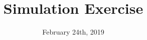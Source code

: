 \documentclass{beamer}
\begin{document}
\newcommand{\clg}{\mathcal{G}}
\newcommand{\clb}{\mathcal{B}}
\newcommand{\cls}{\mathcal{S}}
\newcommand{\clc}{\mathcal{C}}
\newcommand{\clj}{\mathcal{J}}
\newcommand{\clm}{\mathcal{M}}
\newcommand{\clx}{\mathcal{X}}
\newcommand{\cld}{\mathcal{D}}
\newcommand{\cle}{\mathcal{E}}
\newcommand{\clv}{\mathcal{V}}
\newcommand{\clu}{\mathcal{U}}
\newcommand{\clr}{\mathcal{R}}
\newcommand{\clt}{\mathcal{T}}
\newcommand{\cll}{\mathcal{L}}
\newcommand{\clz}{\mathcal{Z}}
\newcommand{\clq}{\mathcal{Q}}

\newcommand{\cli}{\mathcal{I}}
\newcommand{\clp}{\mathcal{P}}
\newcommand{\cla}{\mathcal{A}}
\newcommand{\clf}{\mathcal{F}}
\newcommand{\clh}{\mathcal{H}}
\newcommand{\clo}{\mathcal{O}}
\newcommand{\N}{\mathbb{N}}
\newcommand{\Q}{\mathbb{Q}}
\newcommand{\bfx}{{\boldsymbol{x}}}
\newcommand{\bfa}{{\boldsymbol{a}}}
\newcommand{\bfh}{{\boldsymbol{h}}}
\newcommand{\bfs}{{\boldsymbol{s}}}
\newcommand{\bfm}{{\boldsymbol{m}}}
\newcommand{\bff}{{\boldsymbol{f}}}
\newcommand{\bfb}{{\boldsymbol{b}}}
\newcommand{\bfw}{{\boldsymbol{w}}}
\newcommand{\bfz}{{\boldsymbol{z}}}
\newcommand{\bfu}{{\boldsymbol{u}}}
\newcommand{\bfell}{{\boldsymbol{\ell}}}
\newcommand{\bfn}{{\boldsymbol{n}}}
\newcommand{\bfd}{{\boldsymbol{d}}}
\newcommand{\bfbeta}{{\boldsymbol{\beta}}}
\newcommand{\bfzeta}{{\boldsymbol{\zeta}}}
\newcommand{\bfnu}{{\boldsymbol{\nu}}}
\newcommand{\bfvarphi}{{\boldsymbol{\varphi}}}

\newcommand{\curvz}{{\bf \mathpzc{z}}}
\newcommand{\curvx}{{\bf \mathpzc{x}}}
\newcommand{\curvi}{{\bf \mathpzc{i}}}
\newcommand{\curvs}{{\bf \mathpzc{s}}}
\newcommand{\blip}{\mathbb{B}_1}

\newcommand{\BM}{\mbox{BM}}

\newcommand{\tac}{\mbox{\scriptsize{AC}}}

\title[Triage]{Simulation Exercise} %

\date{February 24th, 2019} %
\end{document}
